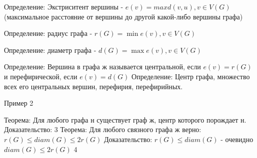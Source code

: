 \documentclass{article}
\begin{document}
Определение: Экстриситент вершины - $e(v)=max d(v,u),v\in V(G)$ (максимальное расстояние от вершины до другой какой-либо вершины графа)

Определение: радиус графа - $r(G)=\min e(v),v\in V(G)$

Определение: диаметр графа - $d(G)=\max e(v),v\in V(G)$

Определение: Вершина в графа ж называется центральной, если $e(v)=r(G)$ и перефирической, если $e(v)=d(G)$
Определение: Центр графа, множество всех его центральных вершин, перефирия, перефирийных.

Пример 2

Теорема: Для любого графа н существует граф ж, центр которого порождает н.
Доказательство: 3
Теорема: Для любого связного графа ж верно: $r(G)\leq diam(G)\leq 2r(G)$
Доказательство: $r(G)\leq diam(G)$ - очевидно
$diam(G)\leq 2r(G)$
4
\end{document}
